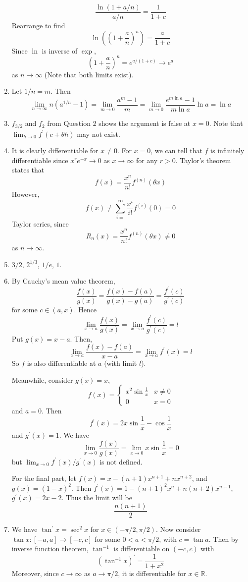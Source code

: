\documentclass[10pt, a4paper, twoside]{report}
\begin{document}
\begin{enumerate}[{1.}]
\[\frac{\ln(1+a/n)}{a/n}=\frac 1{1+c}\]
Rearrange to find 
\[\ln\left(\left(1+\frac an\right)^n\right)=\frac a{1+c}\]
Since \(\ln\) is inverse of \(\exp\), 
\[\left(1+\frac an\right)^n=e^{a/(1+c)}\to e^a\]
as \(n\to\infty\) (Note that both limits exist).
\item Let \(1/n=m\). Then
\[\lim_{n\to\infty}n(a^{1/n}-1)=\lim_{m\to 0}\frac{a^m-1}{m}=\lim_{m\to 0}\frac{e^{m\ln a}-1}{m\ln a}\ln a=\ln a\]
\item \(f_{3/2}\) and \(f_2\) from Question 2 shows the argument is false at \(x=0\). Note that \(\lim_{h\to 0}f^\prime(c+\theta h)\) may not exist. 
\item It is clearly differentiable for \(x\neq 0\). For \(x=0\), we can tell that \(f\) is infinitely differentiable since \(x^re^{-x}\to 0\) as \(x\to\infty\) for any \(r>0\). Taylor's theorem states that 
\[f(x)=\frac{x^n}{n!}f^{(n)}(\theta x)\]
However, 
\[f(x)\neq\sum_{i=}^{\infty}\frac{x^i}{i!}f^{(i)}(0)=0\]
Taylor series, since 
\[R_n(x)=\frac{x^n}{n!}f^{(n)}(\theta x)\neq 0\]
as \(n\to\infty\).
\item \(3/2\), \(2^{1/3}\), \(1/e\), \(1\).
\item By Cauchy's mean value theorem,
\[\frac{f(x)}{g(x)}=\frac{f(x)-f(a)}{g(x)-g(a)}=\frac{f^\prime(c)}{g^\prime(c)}\]
for some \(c\in(a,x)\). Hence 
\[\lim_{x\to a}\frac{f(x)}{g(x)}=\lim_{x\to a}\frac{f^\prime(c)}{g^\prime(c)}=l\]
Put \(g(x)=x-a\). Then,
\[\lim_{x\to a}\frac{f(x)-f(a)}{x-a}=\lim_{x\to a}f^\prime(x)=l\]
So \(f\) is also differentiable at \(a\) (with limit \(l\)).

Meanwhile, consider \(g(x)=x\),
\[f(x)=\begin{cases}
    x^2\sin\frac 1x & x\neq 0 \\
    0 & x=0
\end{cases}\]
and \(a=0\). Then 
\[f^\prime(x)=2x\sin\frac 1x-\cos\frac 1x\]
and \(g^\prime(x)=1\). We have 
\[\lim_{x\to 0}\frac{f(x)}{g(x)}=\lim_{x\to 0}x\sin\frac 1x=0\]
but \(\lim_{x\to 0}f^\prime(x)/g^\prime(x)\) is not defined.

For the final part, let \(f(x)=x-(n+1)x^{n+1}+nx^{n+2}\), and \(g(x)=(1-x)^2\). Then \(f^\prime(x)=1-(n+1)^2x^n+n(n+2)x^{n+1}\), \(g^\prime(x)=2x-2\). Thus the limit will be 
\[\frac{n(n+1)}{2}\]
\item We have \(\tan^\prime x=\sec^2 x\) for \(x\in(-\pi/2,\pi/2)\). Now consider \(\tan x:[-a,a]\to [-c,c]\) for some \(0<a<\pi/2\), with \(c=\tan a\). Then by inverse function theorem, \(\tan^{-1}\) is differentiable on \((-c,c)\) with 
\[(\tan^{-1}x)^\prime=\frac {1}{1+x^2}\]
Moreover, since \(c\to\infty\) as \(a\to \pi/2\), it is differentiable for \(x\in\mathbb{R}\).


\end{enumerate}
\end{document}
